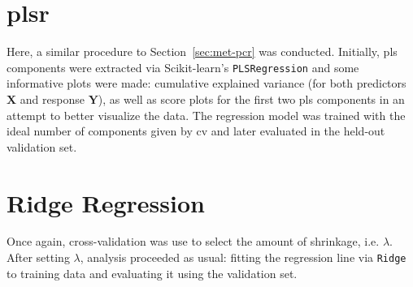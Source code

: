 \section{\acrlong{plsr}}
\label{sec:met-plsr}

Here, a similar procedure to Section~\ref{sec:met-pcr} was conducted. Initially, \acrshort{pls} components were extracted via Scikit-learn's \texttt{PLSRegression} and some informative plots were made: cumulative explained variance (for both predictors $\mathbf{X}$ and response $\mathbf{Y}$), as well as score plots for the first two \acrshort{pls} components in an attempt to better visualize the data. The regression model was trained with the ideal number of components given by \acrshort{cv} and later evaluated in the held-out validation set.

\section{Ridge Regression}
\label{sec:met-ridge}

Once again, cross-validation was use to select the amount of shrinkage, i.e. $\lambda$. After setting $\lambda$, analysis proceeded as usual: fitting the regression line via \texttt{Ridge} to training data and evaluating it using the validation set.



